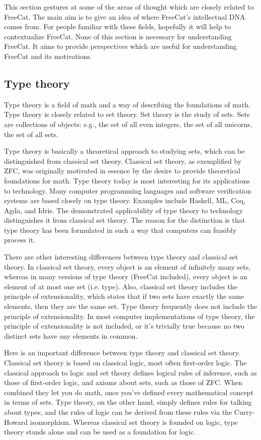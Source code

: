 \documentclass{article}
\begin{document}
This section gestures at some of the areas of thought which are closely related to FreeCat. The main aim is to give an idea of where FreeCat's intellectual DNA comes from. For people familiar with these fields, hopefully it will help to contextualize FreeCat. None of this section is necessary for understanding FreeCat. It aims to provide perspectives which are useful for understanding FreeCat and its motivations.

\subsection{Type theory}

Type theory is a field of math and a way of describing the foundations of math. Type theory is closely related to set theory. Set theory is the study of sets. Sets are collections of objects: e.g., the set of all even integers, the set of all unicorns, the set of all sets.

Type theory is basically a theoretical approach to studying sets, which can be distinguished from classical set theory. Classical set theory, as exemplified by ZFC, was originally motivated in essence by the desire to provide theoretical foundations for math. Type theory today is most interesting for its applications to technology. Many computer programming languages and software verification systems are based closely on type theory. Examples include Haskell, ML, Coq, Agda, and Idris. The demonstrated applicability of type theory to technology distinguishes it from classical set theory. The reason for the distinction is that type theory has been formulated in such a way that computers can feasibly process it.

There are other interesting differences between type theory and classical set theory. In classical set theory, every object is an element of infinitely many sets, whereas in many versions of type theory (FreeCat included), every object is an element of at most one set (i.e. type). Also, classical set theory includes the principle of extensionality, which states that if two sets have exactly the same elements, then they are the same set. Type theory frequently does not include the principle of extensionality. In most computer implementations of type theory, the principle of extensionality is not included, or it's trivially true because no two distinct sets have any elements in common.

Here is an important difference between type theory and classical set theory. Classical set theory is based on classical logic, most often first-order logic. The classical approach to logic and set theory defines logical rules of inference, such as those of first-order logic, and axioms about sets, such as those of ZFC. When combined they let you do math, once you've defined every mathematical concept in terms of sets. Type theory, on the other hand, simply defines rules for talking about types, and the rules of logic can be derived from these rules via the Curry-Howard isomorphism. Whereas classical set theory is founded on logic, type theory stands alone and can be used as a foundation for logic.
\end{document}
